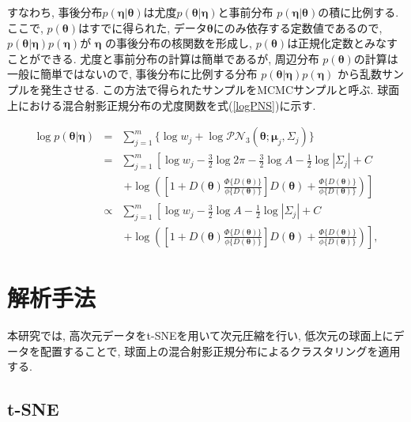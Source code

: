 \documentclass[a4j,12pt]{jarticle}
\begin{document}
\noindent
すなわち, 事後分布$p(\bm \eta | \bm \theta)$は尤度$p(\bm \theta | \bm \eta)$と事前分布 $p(\bm \eta| \bm \theta)$の積に比例する. ここで, $p(\bm \theta)$はすでに得られた, データ$\bm \theta$にのみ依存する定数値であるので, $p(\bm \theta | \bm \eta) p(\bm \eta)$が $\bm \eta$  の事後分布の核関数を形成し, $p(\bm \theta)$は正規化定数とみなすことができる. 尤度と事前分布の計算は簡単であるが, 周辺分布 $p(\bm \theta)$の計算は一般に簡単ではないので, 事後分布に比例する分布 $p(\bm \theta | \bm \eta) p(\bm \eta)$ から乱数サンプルを発生させる. この方法で得られたサンプルをMCMCサンプルと呼ぶ. 球面上における混合射影正規分布の尤度関数を式(\ref{logPNS})に示す. 

\begin{eqnarray}
\label{logPNS}
\log p(\bm \theta | \bm \eta) &=& \sum^m_{j=1} \{\log w_j + \log \mathcal{PN}_3(\bm \theta;\bm \mu_j, \Sigma_j)\} \nonumber \\
&=& \sum^m_{j=1} \left[ \log w_j - \frac{3}{2} \log 2\pi - \frac{3}{2} \log A - \frac{1}{2} \log |\Sigma_j| + C \right. \nonumber \\
&&\  \left. + \log \left( \left[1 + D(\bm \theta) \frac{\Phi \{D(\bm \theta)\}}{\phi \{D(\bm \theta)\}} \right] D(\bm \theta) + \frac{\Phi \{D(\bm \theta)\}}{\phi \{D(\bm \theta)\}} \right)\right] \nonumber \\
&\propto& \sum^m_{j=1} \left[ \log w_j - \frac{3}{2} \log A - \frac{1}{2} \log |\Sigma_j| + C \right. \nonumber \\
&&\ \left. + \log \left( \left[1 + D(\bm \theta) \frac{\Phi \{D(\bm \theta)\}}{\phi \{D(\bm \theta)\}} \right] D(\bm \theta) + \frac{\Phi \{D(\bm \theta)\}}{\phi \{D(\bm \theta)\}} \right) \right], 
\end{eqnarray}


\section{解析手法}

本研究では, 高次元データをt-SNEを用いて次元圧縮を行い, 低次元の球面上にデータを配置することで, 球面上の混合射影正規分布によるクラスタリングを適用する. 

\subsection{t-SNE}
\end{document}

